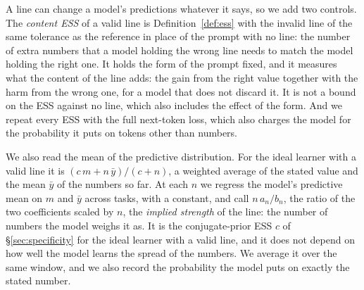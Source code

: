 \documentclass[10pt]{article}
\begin{document}
A line can change a model's predictions whatever it says, so we add two controls. The \emph{content ESS} of a valid line is Definition~\ref{def:ess} with the invalid line of the same tolerance as the reference in place of the prompt with no line: the number of extra numbers that a model holding the wrong line needs to match the model holding the right one. It holds the form of the prompt fixed, and it measures what the content of the line adds: the gain from the right value together with the harm from the wrong one, for a model that does not discard it. It is not a bound on the ESS against no line, which also includes the effect of the form. And we repeat every ESS with the full next-token loss, which also charges the model for the probability it puts on tokens other than numbers.

We also read the mean of the predictive distribution. For the ideal learner with a valid line it is $(c\,m + n\,\bar y)/(c + n)$, a weighted average of the stated value and the mean $\bar y$ of the numbers so far. At each $n$ we regress the model's predictive mean on $m$ and $\bar y$ across tasks, with a constant, and call $n\,a_n/b_n$, the ratio of the two coefficients scaled by $n$, the \emph{implied strength} of the line: the number of numbers the model weighs it as. It is the conjugate-prior ESS $c$ of \S\ref{sec:specificity} for the ideal learner with a valid line, and it does not depend on how well the model learns the spread of the numbers. We average it over the same window, and we also record the probability the model puts on exactly the stated number.

\begin{table}[t]
\centering\small
\setlength{\tabcolsep}{3.5pt}
\caption{A one-line description with a stated tolerance of $\pm 10$, for OLMo~2 models and three wordings ($\pm$: ``Mean: $m \pm 10$''; sent.: the sentence; int.: the interval); $2{,}000$ tasks, $n = 5, \dots, 10$ numbers in hand. ``Strength'' is the implied strength of the line, for a valid and an invalid line. ``Content ESS'' is the ESS of a valid line measured against the invalid line of the same wording, and ``ESS vs.\ no line'' is Definition~\ref{def:ess} as stated, both over the number tokens. The last two columns are the regret with no line. The first Bayes-optimal row is the predictor that takes the line as valid; the second is the predictor that hedges, with a prior probability of validity from $0.5$ to $0.9$. Bootstrap $95\%$ intervals are within $\pm 0.5$ of each ESS and within $\pm 1.0$ of each strength, except the 32B instruction-tuned model's sentence ($\pm 2.7$). Table~\ref{tab:llm-full} has every tolerance.}
\label{tab:llm}
\vspace{3pt}

\end{table}
\end{document}
